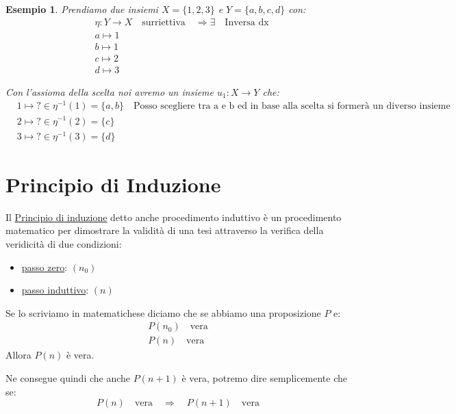 \documentclass{article}
\newtheorem{exmp}{Esempio}[section]
\theoremstyle{definition}
\begin{document}
\begin{exmp}
        Prendiamo due insiemi $ X = \{1,2,3\} $ e $ Y = \{a,b,c,d\} $ con:
        \begin{align*}
                &\eta : Y \to X \quad \mbox{surriettiva} \quad  \Rightarrow \exists \quad \mbox{Inversa dx} \\ 
                & a \mapsto 1 \\
                & b \mapsto 1 \\
                & c \mapsto 2 \\
                & d \mapsto 3
        \end{align*}
        
        Con l'assioma della scelta noi avremo un insieme $ u_1 : X \to Y $ che:
        \begin{align*}
                & 1 \mapsto \mbox{?} \in \eta^{-1}(1) = \{a,b\} \quad \mbox{Posso scegliere tra a e b ed in base alla scelta si formerà un diverso insieme} \\
                & 2 \mapsto \mbox{?} \in \eta^{-1}(2) = \{c\} \\
                & 3 \mapsto \mbox{?} \in \eta^{-1}(3) = \{d\} 
        \end{align*}
\end{exmp}






\newpage
\section{Principio di Induzione}\label{sec:principio_di_induzione}
Il \underline{Principio di induzione} detto anche procedimento induttivo è un procedimento matematico per dimostrare la validità di una tesi attraverso la verifica della veridicità di due condizioni:
\begin{itemize}
        \item \underline{passo zero}: $(n_0)$
        \item \underline{passo induttivo}: $(n)$
\end{itemize}
Se lo scriviamo in matematichese diciamo che se abbiamo una proposizione $P$ e:
\begin{align*}
        P(n_0) \quad \mbox{vera} \\
        P(n) \quad \mbox{vera}
\end{align*}
Allora $P(n)$ è vera. \par
Ne consegue quindi che anche $P(n+1)$ è vera, potremo dire semplicemente che se:
\begin{equation*}
        P(n) \quad \mbox{vera} \quad \Rightarrow \quad P(n+1) \quad \mbox{vera}
\end{equation*}
\end{document}
